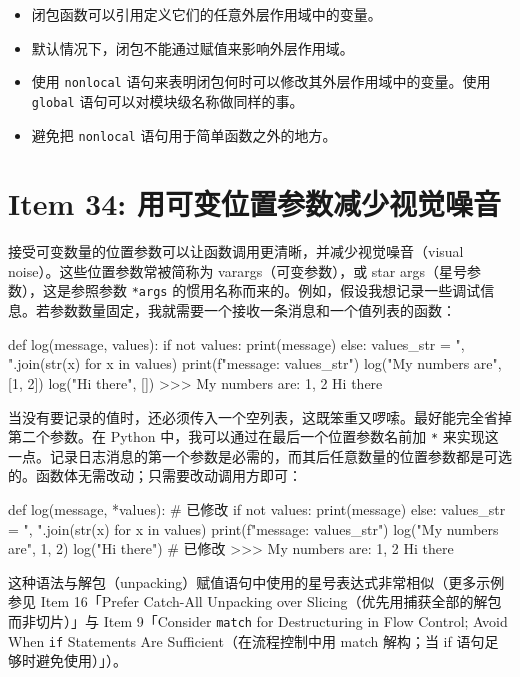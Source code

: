 \begin{itemize}
\item 闭包函数可以引用定义它们的任意外层作用域中的变量。
\item 默认情况下，闭包不能通过赋值来影响外层作用域。
\item 使用 \texttt{nonlocal} 语句来表明闭包何时可以修改其外层作用域中的变量。使用 \texttt{global} 语句可以对模块级名称做同样的事。
\item 避免把 \texttt{nonlocal} 语句用于简单函数之外的地方。
\end{itemize}

\section{Item 34: 用可变位置参数减少视觉噪音}

接受可变数量的位置参数可以让函数调用更清晰，并减少视觉噪音（visual noise）。这些位置参数常被简称为 varargs（可变参数），或 star args（星号参数），这是参照参数 \texttt{*args} 的惯用名称而来的。例如，假设我想记录一些调试信息。若参数数量固定，我就需要一个接收一条消息和一个值列表的函数：

\begin{codebox}[python]
def log(message, values):
    if not values:
        print(message)
    else:
        values_str = ", ".join(str(x) for x in values)
        print(f"{message}: {values_str}")
log("My numbers are", [1, 2])
log("Hi there", [])
>>>
My numbers are: 1, 2
Hi there
\end{codebox}

当没有要记录的值时，还必须传入一个空列表，这既笨重又啰嗦。最好能完全省掉第二个参数。在 Python 中，我可以通过在最后一个位置参数名前加 \texttt{*} 来实现这一点。记录日志消息的第一个参数是必需的，而其后任意数量的位置参数都是可选的。函数体无需改动；只需要改动调用方即可：

\begin{codebox}[python]
def log(message, *values):   # 已修改
    if not values:
        print(message)
    else:
        values_str = ", ".join(str(x) for x in values)
        print(f"{message}: {values_str}")
log("My numbers are", 1, 2)
log("Hi there")              # 已修改
>>>
My numbers are: 1, 2
Hi there
\end{codebox}

这种语法与解包（unpacking）赋值语句中使用的星号表达式非常相似（更多示例参见 Item 16「Prefer Catch-All Unpacking over Slicing（优先用捕获全部的解包而非切片）」与 Item 9「Consider \texttt{match} for Destructuring in Flow Control; Avoid When \texttt{if} Statements Are Sufficient（在流程控制中用 match 解构；当 if 语句足够时避免使用）」）。

